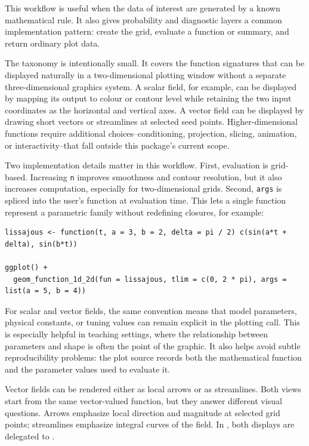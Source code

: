 This workflow is useful when the data of interest are generated by a known
mathematical rule. It also gives probability and diagnostic layers a common
implementation pattern: create the grid, evaluate a function or summary, and
return ordinary plot data.

The taxonomy is intentionally small. It covers the function signatures that can
be displayed naturally in a two-dimensional plotting window without a separate
three-dimensional graphics system. A scalar field, for example, can be
displayed by mapping its output to colour or contour level while retaining the
two input coordinates as the horizontal and vertical axes. A vector field can
be displayed by drawing short vectors or streamlines at selected seed points.
Higher-dimensional functions require additional choices--conditioning,
projection, slicing, animation, or interactivity--that fall outside this
package's current scope.

Two implementation details matter in this workflow. First, evaluation is
grid-based. Increasing \texttt{n} improves smoothness and contour resolution, but it
also increases computation, especially for two-dimensional grids. Second,
\texttt{args} is spliced into the user's function at evaluation time. This lets a
single function represent a parametric family without redefining closures, for example:

\begin{verbatim}
lissajous <- function(t, a = 3, b = 2, delta = pi / 2) c(sin(a*t + delta), sin(b*t))

ggplot() +
  geom_function_1d_2d(fun = lissajous, tlim = c(0, 2 * pi), args = list(a = 5, b = 4))
\end{verbatim}

For scalar and vector fields, the same convention means that model parameters,
physical constants, or tuning values can remain explicit in the plotting call.
This is especially helpful in teaching settings, where the relationship between
parameters and shape is often the point of the graphic. It also helps avoid
subtle reproducibility problems: the plot source records both the mathematical
function and the parameter values used to evaluate it.

Vector fields can be rendered either as local arrows or as streamlines. Both
views start from the same vector-valued function, but they answer different
visual questions. Arrows emphasize local direction and magnitude at selected
grid points; streamlines emphasize integral curves of the field. In
, both displays are delegated to .

